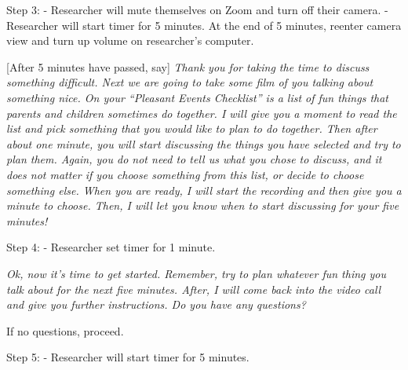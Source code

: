 \documentclass[]{book}
\begin{document}
Step 3:
- Researcher will mute themselves on Zoom and turn off their camera.
- Researcher will start timer for 5 minutes. At the end of 5 minutes, reenter camera view and turn up volume on researcher's computer.

{[}After 5 minutes have passed, say{]} \emph{Thank you for taking the time to discuss something difficult. Next we are going to take some film of you talking about something nice. On your ``Pleasant Events Checklist'' is a list of fun things that parents and children sometimes do together. I will give you a moment to read the list and pick something that you would like to plan to do together. Then after about one minute, you will start discussing the things you have selected and try to plan them. Again, you do not need to tell us what you chose to discuss, and it does not matter if you choose something from this list, or decide to choose something else. When you are ready, I will start the recording and then give you a minute to choose. Then, I will let you know when to start discussing for your five minutes!}

Step 4:
- Researcher set timer for 1 minute.

\emph{Ok, now it's time to get started. Remember, try to plan whatever fun thing you talk about for the next five minutes. After, I will come back into the video call and give you further instructions. Do you have any questions?}

If no questions, proceed.

Step 5:
- Researcher will start timer for 5 minutes.
\end{document}
